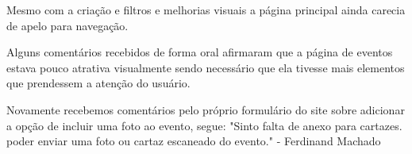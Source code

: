 \par Mesmo com a criação e filtros e melhorias visuais a página principal ainda carecia de apelo para navegação. 
\par Alguns comentários recebidos de forma oral afirmaram que a página de eventos estava pouco atrativa visualmente sendo necessário que ela tivesse mais elementos que prendessem a atenção do usuário. 

\par Novamente recebemos comentários pelo próprio formulário do site sobre adicionar a opção de incluir uma foto ao evento,  segue: "Sinto falta de anexo para cartazes. poder enviar uma foto ou cartaz escaneado do evento." - Ferdinand Machado
